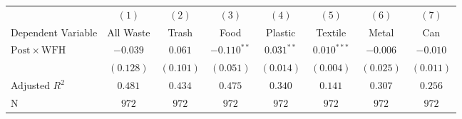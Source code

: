\centering
\small %
\setlength{\tabcolsep}{4pt} %
\begin{tabular}{l *{7}{c}}
\toprule
& $(1)$ & $(2)$ & $(3)$ & $(4)$ & $(5)$ & $(6)$ & $(7)$ \\
\multicolumn{1}{c}{Dependent Variable} & All Waste & Trash & Food & Plastic & Textile & Metal & Can \\
\midrule
$\mathrm{Post} \times \mathrm{WFH}$ & $-0.039$ & $0.061$ & $-0.110^{**}$ & $0.031^{**}$ & $0.010^{***}$ & $-0.006$ & $-0.010$\\
& $(0.128)$ & $(0.101)$ & $(0.051)$ & $(0.014)$ & $(0.004)$ & $(0.025)$ & $(0.011)$\vspace{1mm} \\
Adjusted $R^2$ & $0.481$ & $0.434$ & $0.475$ & $0.340$ & $0.141$ & $0.307$ & $0.256$\\
$\mathrm{N}$ & $972$ & $972$ & $972$ & $972$ & $972$ & $972$ & $972$\\
\bottomrule
\end{tabular}
